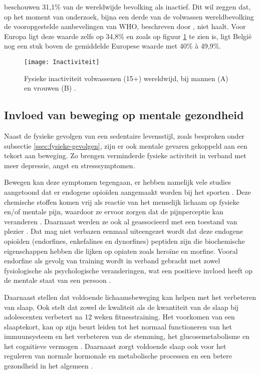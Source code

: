 \textcite{Hallal2012} beschouwen 31,1\% van de wereldwijde bevolking als inactief. Dit wil zeggen dat, op het moment van onderzoek, bijna een derde van de volwassen wereldbevolking de vooropgestelde aanbevelingen van WHO, beschreven door \textcite{Bull2020}, niet haalt. Voor Europa ligt deze waarde zelfs op 34,8\% en zoals op figuur \ref{fig:inactivity} te zien is, ligt België nog een stuk boven de gemiddelde Europese waarde met 40\% à 49,9\%.

\begin{figure}[h]
    \caption[Fysieke inactiviteit bij volwassenen wereldwijd]{Fysieke inactiviteit volwassenen (15+) wereldwijd, bij mannen (A) en vrouwen (B) \autocite{Bull2020}.}
    \texttt{[image: Inactiviteit]}
    \label{fig:inactivity}
\end{figure}

\subsection{Invloed van beweging op mentale gezondheid}
Naast de fysieke gevolgen van een sedentaire levensstijl, zoals besproken onder subsectie \ref{ssec:fysieke-gevolgen}, zijn er ook mentale gevaren gekoppeld aan een tekort aan beweging. Zo brengen \textcite{Stanton2020} verminderde fysieke activiteit in verband met meer depressie, angst en stresssymptomen.

Bewegen kan deze symptomen tegengaan, er hebben namelijk vele studies aangetoond dat er endogene opioïden aangemaakt worden bij het sporten \autocite{Harber1984}. Deze chemische stoffen komen vrij als reactie van het menselijk lichaam op fysieke en/of mentale pijn, waardoor ze ervoor zorgen dat de pijnperceptie kan veranderen \autocite{Chaudhry2023, Dishman2009}. Daarnaast werden ze ook al geassocieerd met een toestand van plezier \autocite{Chaudhry2023}.
Dat mag niet verbazen eenmaal uiteengezet wordt dat deze endogene opioïden (endorfines, enkefalines en dynorfines) peptiden zijn die biochemische eigenschappen hebben die lijken op opiaten zoals heroïne en morfine. Vooral endorfine als gevolg van training wordt in verband gebracht met zowel fysiologische als psychologische veranderingen, wat een positieve invloed heeft op de mentale staat van een persoon \autocite{Dishman2009}.

Daarnaast stellen \textcite{Mahindru2023} dat voldoende lichaamsbeweging kan helpen met het verbeteren van slaap. Ook \textcite{Ghrouz2019} stelt dat zowel de kwaliteit als de kwantiteit van de slaap bij adolescenten verbetert na 12 weken fitnesstraining. Het voorkomen van een slaaptekort, kan op zijn beurt leiden tot het normaal functioneren van het immuunsysteem en het verbeteren van de stemming, het glucosemetabolisme en het cognitieve vermogen \autocite{Mahindru2023}. Daarnaast zorgt voldoende slaap ook voor het reguleren van normale hormonale en metabolische processen en een betere gezondheid in het algemeen \autocite{Dolezal2017}.

